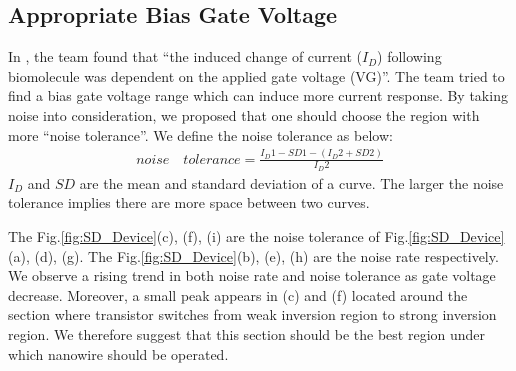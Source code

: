 \subsection*{Appropriate Bias Gate Voltage}
In \cite{C6}, the team found that ``the induced change of current ($I_D$) following biomolecule was dependent on the applied gate voltage (VG)''.
The team tried to find a bias gate voltage range which can induce more current response.
By taking noise into consideration, we proposed that one should choose the region with more ``noise tolerance''.
We define the noise tolerance as below:
\setlength{\mathindent}{2cm}
\begin{align}
    noise \quad tolerance = \frac{I_D1 - SD1 - (I_D2 + SD2)}{I_D2}
\end{align}
$I_D$ and $SD$ are the mean and standard deviation of a curve.
The larger the noise tolerance implies there are more space between two curves.

The Fig.\ref{fig:SD_Device}(c), (f), (i) are the noise tolerance of Fig.\ref{fig:SD_Device}(a), (d), (g).
The Fig.\ref{fig:SD_Device}(b), (e), (h) are the noise rate respectively.
We observe a rising trend in both noise rate and noise tolerance as gate voltage decrease.
Moreover, a small peak appears in (c) and (f) located around the section where transistor switches from weak inversion region to strong inversion region.
We therefore suggest that this section should be the best region under which nanowire should be operated.


